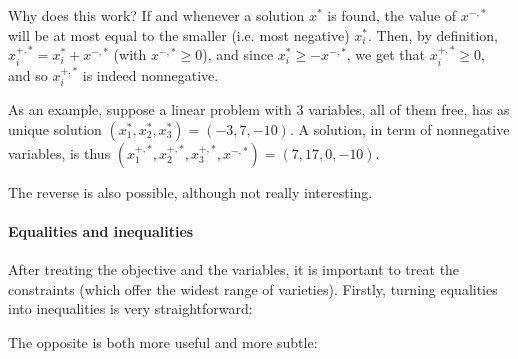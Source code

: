 \documentclass[a4paper]{article}
\begin{document}
Why does this work? If and whenever a solution $x^*$ is found, the value of $x^{-,*}$ will be at most equal to the smaller (i.e. most negative) $x_i^*$. Then, by definition, $x_i^{+,*} = x_i^* + x^{-,*}$ (with $x^{-,*} \geq 0$), and since $x_i^* \geq -x^{-,*}$, we get that $x_i^{+,*} \geq 0$, and so $x_i^{+,*}$ is indeed nonnegative. 

As an example, suppose a linear problem with 3 variables, all of them free, has as unique solution $(x_1^*, x_2^*, x_3^*) = (-3, 7, -10)$. A solution, in term of nonnegative variables, is thus $(x_1^{+,*}, x_2^{+,*}, x_3^{+,*}, x^{-,*}) = (7,17,0,-10)$.

\vspace{5pt}
The reverse is also possible, although not really interesting.

\begin{center}
\end{center}


\paragraph{Equalities and inequalities}
After treating the objective and the variables, it is important to treat the constraints (which offer the widest range of varieties). Firstly, turning equalities into inequalities is very straightforward:

\begin{center}
\end{center}

The opposite is both more useful and more subtle:

\begin{center}
\end{center}
\end{document}
